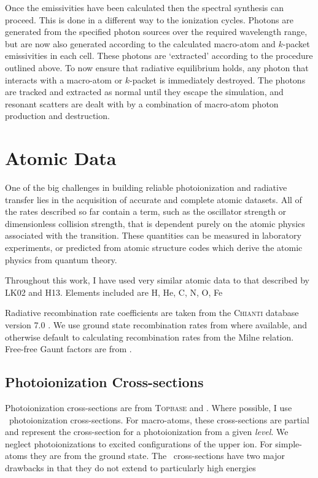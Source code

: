 Once the emissivities have been calculated then the spectral synthesis can proceed.
This is done in a different way to the ionization cycles. Photons 
are generated from the specified photon sources over the required wavelength range,
but are now also generated according to the calculated macro-atom and 
$k$-packet emissivities in each cell. These photons are `extracted' according
to the procedure outlined above.
To now ensure that radiative equilibrium 
holds, any photon that interacts with a macro-atom or $k$-packet is immediately 
destroyed. The photons are tracked and extracted as normal until they escape the 
simulation, and resonant scatters are dealt with by a combination of
macro-atom photon production and destruction.

\section{Atomic Data}
\label{sec:atomic_data}
One of the big challenges in building reliable photoionization and radiative
transfer lies in the acquisition of accurate and complete atomic datasets.
All of the rates described so far contain a term, such as the oscillator strength 
or dimensionless collision strength, that is dependent purely on the atomic physics
associated with the transition. These quantities can be measured in laboratory experiments,
or predicted from atomic structure codes which derive the atomic physics from 
quantum theory.

Throughout this work, I have used very similar atomic data to that described 
by LK02 and H13. Elements included are H, He, C, N, O, Fe

Radiative recombination rate coefficients are taken from 
the \textsc{Chianti} database version 7.0 \citep{dere1997,landi2012}.
We use ground state recombination rates from \cite{badnell2006} where available,
and otherwise default to calculating recombination rates from the Milne
relation. Free-free Gaunt factors are from \cite{sutherland1998}.

\subsection{Photoionization Cross-sections}

Photoionization cross-sections are from \textsc{Topbase} \citep{cunto1993} and \cite{vfky}.
Where possible, I use \top\ photoionization cross-sections. For macro-atoms,
these cross-sections are partial and represent the cross-section for a photoionization
from a given {\em level}. We neglect photoionizations to excited configurations
of the upper ion. For simple-atoms they are from the ground state.
The \top\ cross-sections have two major drawbacks in that they do not 
extend to particularly high energies 


